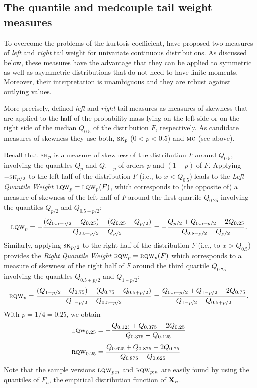 \subsection{The quantile and medcouple tail weight measures}

To overcome the problems of the kurtosis coefficient, \citet{brys:etal:2006}
have proposed two measures of \emph{left} and \emph{right} tail weight for
univariate continuous distributions. As discussed below, these measures have
the advantage that they can be applied to symmetric as well as asymmetric
distributions that do not need to have finite moments. Moreover, their
interpretation is unambiguous and they are robust against outlying values.

More precisely, \citet{brys:etal:2006} defined \emph{left} and \emph{right}
tail measures as measures of skewness that are applied to the half of the
probability mass lying on the left side or on the right side of the median
$Q_{0.5}$ of the distribution $F$, respectively. As candidate measures of skewness 
they use both, $\stsc{SK}_p$ ($0<p<0.5$) and $\stsc{MC}$ (see above).

Recall that $\stsc{SK}_p$ is a measure of skewness of the distribution $F$
around $Q_{0.5}$, involving the quantiles $Q_p$ and $Q_{1-p}$ of orders $p$
and $(1-p)$ of $F$. Applying $-\stsc{SK}_{p/2}$ to the left half of the
distribution $F$ (i.e., to $x<Q_{0.5}$) leads to the \emph{Left Quantile
Weight} $\stsc{LQW}_p = \stsc{LQW}_p(F)$, which corresponds to (the
opposite of) a measure of skewness of the left half of $F$ around the first
quartile $Q_{0.25}$ involving the quantiles $Q_{p/2}$ and $Q_{0.5-p/2}$:
\[
    \stsc{LQW}_p 
    = -\frac{(Q_{0.5-p/2} - Q_{0.25}) - (Q_{0.25} - Q_{p/2})}{Q_{0.5-p/2}-Q_{p/2}}
    = -\frac{Q_{p/2}  +Q_{0.5-p/2} - 2 Q_{0.25}}{Q_{0.5-p/2} - Q_{p/2}}.
\]
Similarly, applying $\stsc{SK}_{p/2}$ to the right half of the distribution
$F$ (i.e., to $x>Q_{0.5}$) provides the \emph{Right Quantile Weight}
$\stsc{RQW}_p = \stsc{RQW}_p(F)$ which corresponds to a measure of
skewness of the right half of $F$ around the third quartile $Q_{0.75}$
involving the quantiles $Q_{0.5+p/2}$ and $Q_{1-p/2}$:
\[
    \stsc{RQW}_p
    = \frac{(Q_{1-p/2} - Q_{0.75}) - (Q_{0.75} - Q_{0.5+p/2})}{Q_{1-p/2} - Q_{0.5+p/2}}
    = \frac{Q_{0.5+p/2} + Q_{1-p/2} - 2 Q_{0.75}}{Q_{1-p/2} - Q_{0.5+p/2}}.
\]
With $p = 1/4 = 0.25$, we obtain
%
\begin{align*}
    \stsc{LQW}_{0.25} & = -\frac{Q_{0.125} + Q_{0.375} - 2 Q_{0.25}}{Q_{0.375} - Q_{0.125}}\\[1ex]
    \stsc{RQW}_{0.25} & =  \frac{Q_{0.625} + Q_{0.875} - 2 Q_{0.75}}{Q_{0.875} - Q_{0.625}}
\end{align*}
%
Note that the sample versions $\stsc{LQW}_{p;n}$ and $\stsc{RQW}_{p;n}$
are easily found by using the quantiles of $F_n$, the empirical distribution
function of $\mathbf X_n$.

